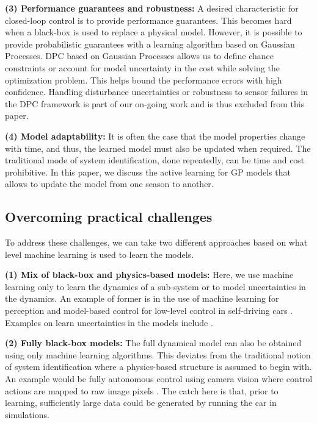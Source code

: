 \noindent \textbf{(3) Performance guarantees and robustness:} A desired characteristic for closed-loop control is to provide performance guarantees. This becomes hard when a black-box is used to replace a physical model. However, it is possible to provide probabilistic guarantees with a learning algorithm based on Gaussian Processes. DPC based on Gaussian Processes allows us to define chance constraints or account for model uncertainty in the cost while solving the optimization problem. This helps bound the performance errors with high confidence. Handling disturbance uncertainties or robustness to sensor failures in the DPC framework is part of our on-going work and is thus excluded from this paper.

\noindent \textbf{(4) Model adaptability:} It is often the case that the model properties change with time, and thus, the learned model must also be updated when required. The traditional mode of system identification, done repeatedly, can be time and cost prohibitive. In this paper, we discuss the active learning for GP models that allows to update the model from one season to another.


\subsection{Overcoming practical challenges}
To address these challenges, we can take two different approaches based on what level machine learning is used to learn the models.

\noindent \textbf{(1) Mix of black-box and physics-based models:} Here, we use machine learning only to learn the dynamics of a sub-system or to model uncertainties in the dynamics. An example of former is in the use of machine learning for perception and model-based control for low-level control in self-driving cars \cite{Urmson2008}. Examples on learn uncertainties in the models include \cite{Berkenkamp2015,Desaraju2016}.

\noindent \textbf{(2) Fully black-box models:} The full dynamical model can also be obtained using only machine learning algorithms. This deviates from the traditional notion of system identification where a physics-based structure is assumed to begin with. An example would be fully autonomous control using camera vision where control actions are mapped to raw image pixels \cite{Bojarski2016}. The catch here is that, prior to learning, sufficiently large data could be generated by running the car in simulations.

